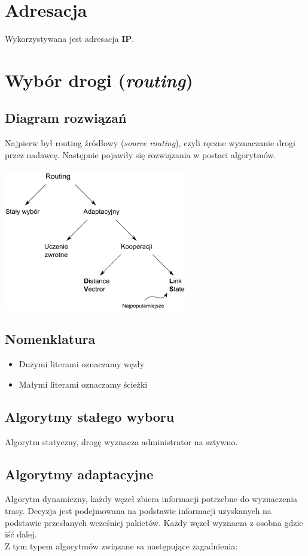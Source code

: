 	\section{Adresacja}
		Wykorzystywana jest adresacja \textbf{IP}.
	\section{Wybór drogi (\emph{routing})}
		\subsection{Diagram rozwiązań}
			Najpierw był routing źródłowy (\emph{source routing}), czyli ręczne wyznaczanie drogi przez nadawcę. Następnie pojawiły się rozwiązania w postaci algorytmów.\\\\
			\includegraphics[width=8cm]{./images/image35.pdf}
		\subsection{Nomenklatura}
			\begin{itemize}
				\item Dużymi literami oznaczamy węzły
				\item Małymi literami oznaczamy ścieżki
			\end{itemize}
		\subsection{Algorytmy stałego wyboru}
			Algorytm statyczny, drogę wyznacza administrator na sztywno.
		\subsection{Algorytmy adaptacyjne}
			Algorytm dynamiczny, każdy węzeł zbiera informacji potrzebne do wyznaczenia trasy. Decyzja jest podejmowana na podstawie informacji uzyskanych na podstawie przesłanych wcześniej pakietów. Każdy węzeł wyznacza z osobna gdzie iść dalej.\\
			Z tym typem algorytmów związane sa następujące zagadnienia:
